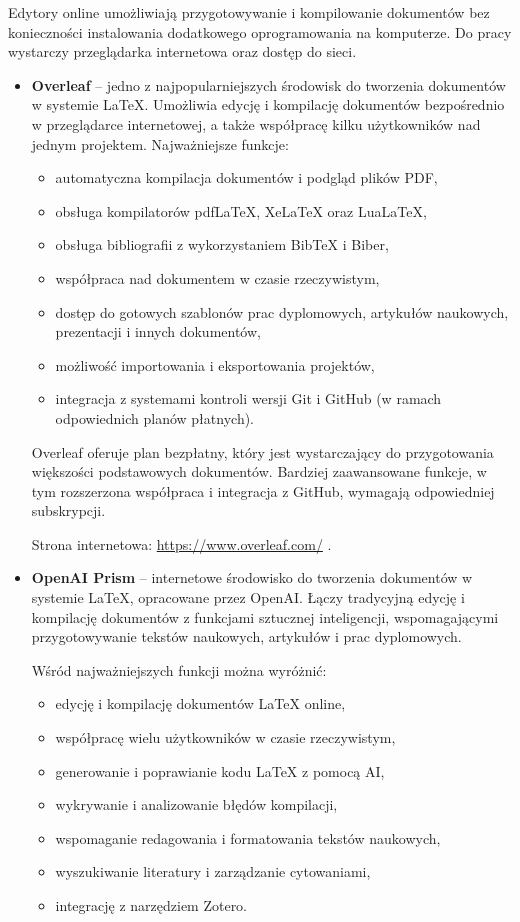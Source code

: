 Edytory online umożliwiają przygotowywanie i kompilowanie dokumentów bez konieczności instalowania dodatkowego oprogramowania na komputerze. Do pracy wystarczy przeglądarka internetowa oraz dostęp do sieci.

\begin{itemize}

    \item \textbf{Overleaf} -- jedno z najpopularniejszych środowisk do tworzenia dokumentów w systemie \LaTeX{}. Umożliwia edycję i kompilację dokumentów bezpośrednio w przeglądarce internetowej, a także współpracę kilku użytkowników nad jednym projektem. Najważniejsze funkcje:
    \begin{itemize}
        \item automatyczna kompilacja dokumentów i podgląd plików PDF,
        \item obsługa kompilatorów pdfLaTeX, XeLaTeX oraz LuaLaTeX,
        \item obsługa bibliografii z wykorzystaniem BibTeX i Biber,
        \item współpraca nad dokumentem w czasie rzeczywistym,
        \item dostęp do gotowych szablonów prac dyplomowych, artykułów naukowych, prezentacji i innych dokumentów,
        \item możliwość importowania i eksportowania projektów,
        \item integracja z systemami kontroli wersji Git i GitHub (w ramach odpowiednich planów płatnych).
    \end{itemize}

    Overleaf oferuje plan bezpłatny, który jest wystarczający do przygotowania większości podstawowych dokumentów. Bardziej zaawansowane funkcje, w tym rozszerzona współpraca i integracja z GitHub, wymagają odpowiedniej subskrypcji.

    Strona internetowa: \url{https://www.overleaf.com/} \cite{Overleaf}.


\item \textbf{OpenAI Prism} -- internetowe środowisko do tworzenia dokumentów w systemie \LaTeX{}, opracowane przez OpenAI. Łączy tradycyjną edycję i kompilację dokumentów z funkcjami sztucznej inteligencji, wspomagającymi przygotowywanie tekstów naukowych, artykułów i prac dyplomowych.

Wśród najważniejszych funkcji można wyróżnić:
\begin{itemize}
    \item edycję i kompilację dokumentów \LaTeX{} online,
    \item współpracę wielu użytkowników w czasie rzeczywistym,
    \item generowanie i poprawianie kodu \LaTeX{} z pomocą AI,
    \item wykrywanie i analizowanie błędów kompilacji,
    \item wspomaganie redagowania i formatowania tekstów naukowych,
    \item wyszukiwanie literatury i zarządzanie cytowaniami,
    \item integrację z narzędziem Zotero.
\end{itemize}


\end{itemize}
